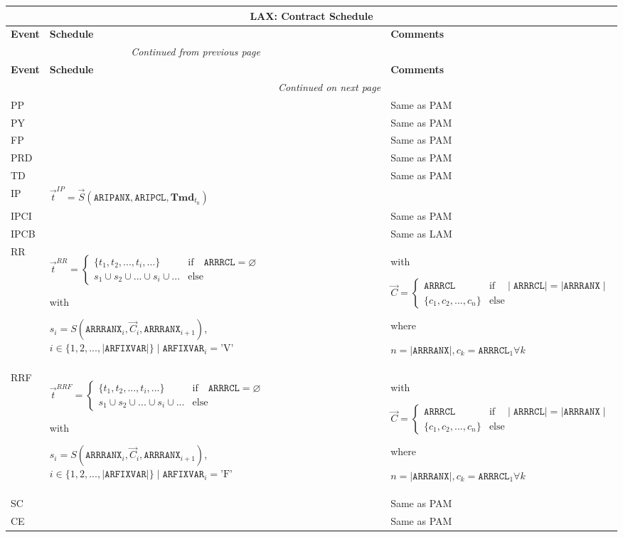 \documentclass[9pt,oneside]{amsart}
\newenvironment{schedule}[1]{
	\hfill %
	\begin{longtable}{| p{0.05\textwidth} | p{0.5\textwidth} |  p{0.4\textwidth} |}
	\multicolumn{3}{c}{\textbf{#1: Contract Schedule}}\\
	\hline
	\textbf{Event} & \textbf{Schedule} & \textbf{Comments} \\
	\hline
	\endfirsthead
	\multicolumn{2}{c}{\textit{Continued from previous page}} \\
	\hline
	\textbf{Event} & \textbf{Schedule} & \textbf{Comments} \\
	\hline
	\endhead
	\hline \multicolumn{2}{r}{\textit{Continued on next page}} \\
	\endfoot
	\endlastfoot
}{%
	\hline
	\end{longtable}
}
\newcommand{\svar}[2]{\textbf{#1}_{#2}}
\newcommand{\attr}[1]{\texttt{#1}}
\newcommand{\sdl}[3]{S(#1,#2,#3)}
\newcommand{\vsdl}[3]{\vec{S}(#1,#2,#3)}
\newcommand{\undef}{\varnothing}
\begin{document}
\begin{schedule}{LAX}
	\hline
	PP & & Same as PAM \\
	\hline
	PY & & Same as PAM \\
	\hline
	FP & & Same as PAM \\
	\hline
	PRD & & Same as PAM \\
	\hline
	TD & & Same as PAM \\
	\hline
	IP & $\vec{t}^{IP} = \vsdl{\attr{ARIPANX}}{\attr{ARIPCL}}{\svar{Tmd}{t_0}}$ & \\
	\hline
	IPCI & & Same as PAM \\
  	\hline
	IPCB & & Same as LAM \\
	\hline
	RR & $\vec{t}^{RR} = \begin{cases} \{ t_1, t_2, ..., t_i, ... \} & \text{if}\quad \attr{ARRRCL}=\undef \\
					s_1 \cup s_2 \cup ... \cup s_i \cup ... & \text{else} \end{cases}$ \par
		with\par
		$s_i=\sdl{\attr{ARRRANX}_i}{\vec{C}_i}{\attr{ARRRANX}_{i+1}}$, $i\in\{1,2,...,\mid\attr{ARFIXVAR}\mid\} \mid \attr{ARFIXVAR}_i = \text{'V'}$
		& with\par $\vec{C} = \begin{cases} \attr{ARRRCL} & \text{if} \quad \mid\attr{ARRRCL}\mid = \mid \attr{ARRRANX}\mid \\
				   \{ c_1, c_2, ..., c_n \}  & \text{else} \end{cases}$ \par
			where\par
			$n=\mid\attr{ARRRANX}\mid, c_k=\attr{ARRRCL}_1\forall k$ \\
	\hline
	RRF & $\vec{t}^{RRF} = \begin{cases} \{ t_1, t_2, ..., t_i, ... \} & \text{if}\quad \attr{ARRRCL}=\undef \\
					s_1 \cup s_2 \cup ... \cup s_i \cup ... & \text{else} \end{cases}$ \par
		with\par
		$s_i=\sdl{\attr{ARRRANX}_i}{\vec{C}_i}{\attr{ARRRANX}_{i+1}}$, $i\in\{1,2,...,\mid\attr{ARFIXVAR}\mid\} \mid \attr{ARFIXVAR}_i = \text{'F'}$
		& with\par $\vec{C} = \begin{cases} \attr{ARRRCL} & \text{if} \quad \mid\attr{ARRRCL}\mid = \mid \attr{ARRRANX}\mid \\
				   \{ c_1, c_2, ..., c_n \}  & \text{else} \end{cases}$ \par
			where\par
			$n=\mid\attr{ARRRANX}\mid, c_k=\attr{ARRRCL}_1\forall k$ \\
	\hline
	SC & & Same as PAM \\
	\hline
	CE & & Same as PAM \\
\end{schedule}
\end{document}

